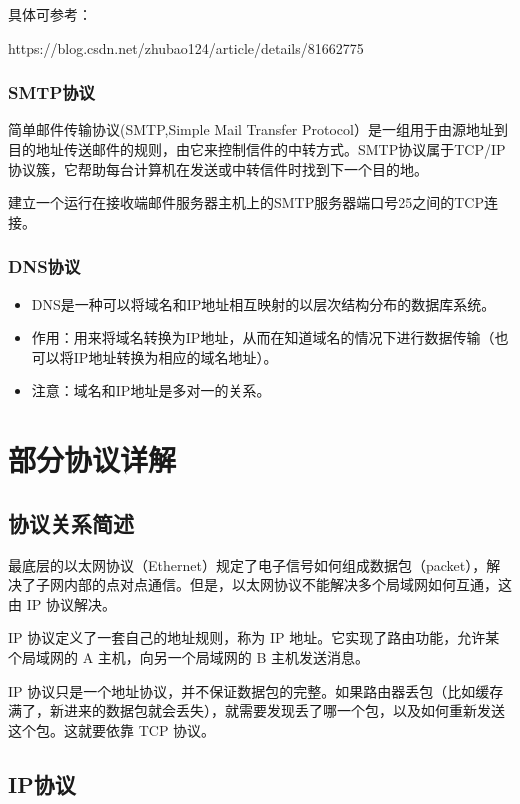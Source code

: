 \documentclass[UTF8]{article}%
\begin{document}
具体可参考：

https://blog.csdn.net/zhubao124/article/details/81662775

\subsubsection{SMTP协议}

简单邮件传输协议(SMTP,Simple Mail Transfer Protocol）是一组用于由源地址到目的地址传送邮件的规则，由它来控制信件的中转方式。SMTP协议属于TCP/IP协议簇，它帮助每台计算机在发送或中转信件时找到下一个目的地。

建立一个运行在接收端邮件服务器主机上的SMTP服务器端口号25之间的TCP连接。

\subsubsection{DNS协议}

\begin{itemize}
    \item DNS是一种可以将域名和IP地址相互映射的以层次结构分布的数据库系统。
    \item 作用：用来将域名转换为IP地址，从而在知道域名的情况下进行数据传输（也可以将IP地址转换为相应的域名地址）。
    \item 注意：域名和IP地址是多对一的关系。
\end{itemize}




 

\section{部分协议详解}

\subsection{协议关系简述}

最底层的以太网协议（Ethernet）规定了电子信号如何组成数据包（packet），解决了子网内部的点对点通信。但是，以太网协议不能解决多个局域网如何互通，这由 IP 协议解决。

IP 协议定义了一套自己的地址规则，称为 IP 地址。它实现了路由功能，允许某个局域网的 A 主机，向另一个局域网的 B 主机发送消息。

IP 协议只是一个地址协议，并不保证数据包的完整。如果路由器丢包（比如缓存满了，新进来的数据包就会丢失），就需要发现丢了哪一个包，以及如何重新发送这个包。这就要依靠 TCP 协议。

\subsection{IP协议}
\end{document}
